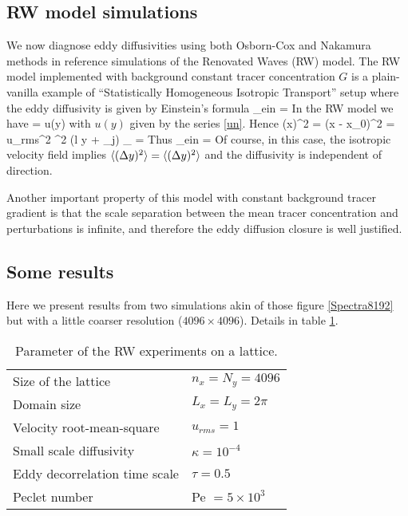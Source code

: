 \documentclass[11pt]{article}
\begin{document}
\subsection{RW model simulations}
We now diagnose eddy diffusivities using both Osborn-Cox and Nakamura methods in reference simulations of the Renovated Waves (RW) model.  The RW model implemented with background constant tracer concentration $G$ is a plain-vanilla example of ``Statistically Homogeneous Isotropic Transport'' setup where the eddy diffusivity is given by Einstein's formula
\beq
\label{einstein_eddy_diffusivity}
\kappa_{ein} = \per
\eeq 
In the RW model we have
\beq
\label{dxdt}
 = u(y)\com
\eeq
with $u(y)$ given by the series \eqref{un}. Hence
\beq
\label{dx2}
\la (\Delta x)^2 \ra = \la (x - x_0)^2 \ra = u_{rms}^2 \tau^2 \la \cos (l y + \psi_j) \ra_{\psi} = \per 
\eeq
Thus
\beq
\label{einstein_eddy_diffusivity}
\kappa_{ein} = \per
\eeq 
Of course, in this case, the isotropic velocity field implies $\langle (\Delta y)^2\rangle = \langle (\Delta y)^2\rangle$ and the diffusivity is independent of direction.

Another important property of this model with constant background tracer gradient is that the scale separation between the mean tracer concentration and perturbations is infinite, and therefore the eddy diffusion closure is well justified.

\subsection{Some results}

Here we present results from two simulations akin of those figure \ref{Spectra8192} but with a little coarser resolution ($4096\times 4096$). Details in table \ref{RWExp}.
\begin{table}
\begin{center}
   \caption{\small Parameter of the RW experiments on a lattice.}
    \begin{tabular}{  l | l}
    \hline
    \hline
    	Size of the lattice & $n_x = N_y = 4096$\\
	Domain size & $L_x = L_y = 2 \pi$\\
	Velocity root-mean-square & $u_{rms} = 1$ \\
	Small scale diffusivity & $\kappa = 10^{-4} $\\
	Eddy decorrelation time scale & $\tau = 0.5$ \\
	Peclet number & \textsf{Pe} $= 5 \times10^3 $\\
    \hline
    \end{tabular}
    \end{center}
    \label{RWExp}
        \end{table}
\end{document}
